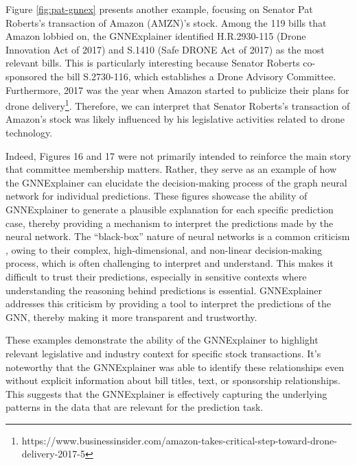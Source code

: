 \documentclass[15pt,letterpaper]{article}
\begin{document}
Figure \ref{fig:pat-gnnex} presents another example, focusing on Senator Pat Roberts's transaction of Amazon (AMZN)'s stock. Among the 119 bills that Amazon lobbied on, the GNNExplainer identified H.R.2930-115 (Drone Innovation Act of 2017) and S.1410 (Safe DRONE Act of 2017) as the most relevant bills. This is particularly interesting because Senator Roberts co-sponsored the bill S.2730-116, which establishes a Drone Advisory Committee. Furthermore, 2017 was the year when Amazon started to publicize their plans for drone delivery\footnote{https://www.businessinsider.com/amazon-takes-critical-step-toward-drone-delivery-2017-5}. 
Therefore, we can interpret that Senator Roberts's transaction of Amazon's stock was likely influenced by his legislative activities related to drone technology.

Indeed, Figures 16 and 17 were not primarily intended to reinforce the main story that committee membership matters. Rather, they serve as an example of how the GNNExplainer can elucidate the decision-making process of the graph neural network for individual predictions. These figures showcase the ability of GNNExplainer to generate a plausible explanation for each specific prediction case, thereby providing a mechanism to interpret the predictions made by the neural network.
The ``black-box'' nature of neural networks is a common criticism \citep{bb4, bb5, bb6}, owing to their complex, high-dimensional, and non-linear decision-making process, which is often challenging to interpret and understand. This makes it difficult to trust their predictions, especially in sensitive contexts where understanding the reasoning behind predictions is essential. GNNExplainer addresses this criticism by providing a tool to interpret the predictions of the GNN, thereby making it more transparent and trustworthy.




These examples demonstrate the ability of the GNNExplainer to highlight relevant legislative and industry context for specific stock transactions. It's noteworthy that the GNNExplainer was able to identify these relationships even without explicit information about bill titles, text, or sponsorship relationships. This suggests that the GNNExplainer is effectively capturing the underlying patterns in the data that are relevant for the prediction task.
\end{document}
